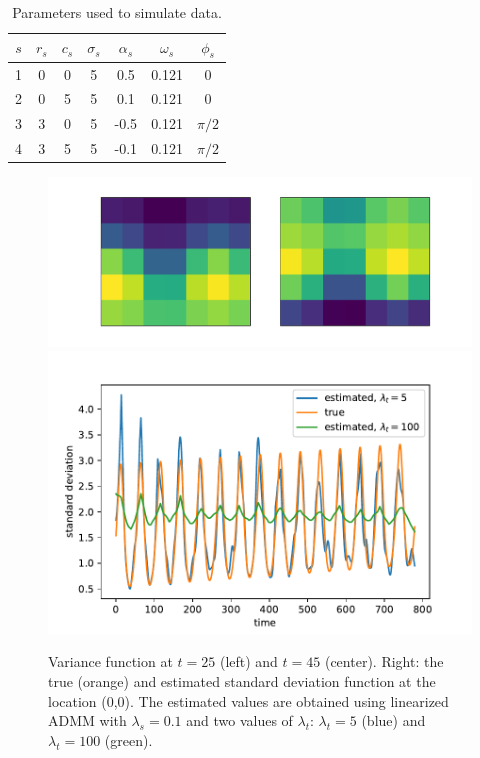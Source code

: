 \documentclass{article}
\begin{document}
\begin{table}[tb]
  \caption{Parameters used to simulate data.}
  \label{tab:sim_params}
  \begin{center}
    \begin{tabular}{ccccccc}
      \hline
      $s$ & $r_s$ & $c_s$ & $\sigma_s$ &$\alpha_s$ & $\omega_s$ & $\phi_s$\\
      \hline
      1 & 0 & 0 & 5 & 0.5 & 0.121 & 0 \\
      2 & 0 & 5 & 5 & 0.1 & 0.121 & 0 \\
      3 & 3 & 0 & 5 & -0.5 & 0.121 & $\pi/2$ \\
      4 & 3 & 5 & 5 & -0.1 & 0.121 & $\pi/2$ \\
      \hline
    \end{tabular}
  \end{center}
\end{table} 

\begin{figure}[tb]
  \centering	
  \includegraphics[height=.15\textheight]{Figures/true_var_spatial}
  \includegraphics[height=.15\textheight]{Figures/true_fitted_var}
  \caption{Variance function at $t=25$ (left) and $t=45$
    (center). Right: the true (orange) and estimated standard deviation 
    function at the location (0,0). The estimated values are
    obtained using linearized ADMM with $\lambda_s=0.1$ and two
    values of $\lambda_t$: $\lambda_t=5$ (blue) and
    $\lambda_t=100$ (green).} \label{fig:true_var_spatial}
\end{figure}
\end{document}

